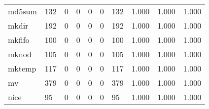 \begin{longtable}{lp{2.0cm}p{2.0cm}p{2.0cm}p{2.0cm}p{2.0cm}p{2.0cm}p{2.0cm}p{2.0cm}p{2.0cm}}
md5sum    &                    132 &                                  0 &                                 0 &                                0 &                                 0 &                             132 &                                1.000 &                                  1.000 &                                1.000 \\
mkdir     &                    192 &                                  0 &                                 0 &                                0 &                                 0 &                             192 &                                1.000 &                                  1.000 &                                1.000 \\
mkfifo    &                    100 &                                  0 &                                 0 &                                0 &                                 0 &                             100 &                                1.000 &                                  1.000 &                                1.000 \\
mknod     &                    105 &                                  0 &                                 0 &                                0 &                                 0 &                             105 &                                1.000 &                                  1.000 &                                1.000 \\
mktemp    &                    117 &                                  0 &                                 0 &                                0 &                                 0 &                             117 &                                1.000 &                                  1.000 &                                1.000 \\
mv        &                    379 &                                  0 &                                 0 &                                0 &                                 0 &                             379 &                                1.000 &                                  1.000 &                                1.000 \\
nice      &                     95 &                                  0 &                                 0 &                                0 &                                 0 &                              95 &                                1.000 &                                  1.000 &                                1.000 \\

\end{longtable}
